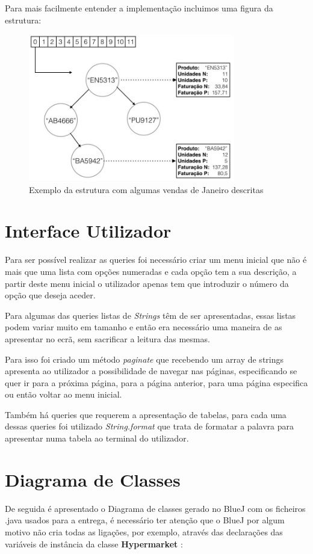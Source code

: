 \documentclass[10pt] {article}
\begin{document}
Para mais facilmente entender a implementação incluimos uma figura da estrutura:

\begin{figure}[ht!]
\centering
\includegraphics[width=90mm]{accounting.jpg}
\caption{Exemplo da estrutura com algumas vendas de Janeiro descritas}
\label{fig:sales}
\end{figure}

\newpage
\section{Interface Utilizador}

Para ser possível realizar as queries foi necessário criar um menu inicial que não é mais que uma lista com opções numeradas e cada opção tem a sua descrição, a partir deste menu inicial o utilizador apenas tem que introduzir o número da opção que deseja aceder.

Para algumas das queries listas de \emph{Strings} têm de ser apresentadas, essas listas podem variar muito  em tamanho e então era necessário uma maneira de as apresentar no ecrã, sem sacrificar a leitura das mesmas.

Para isso foi criado um método \emph{paginate} que recebendo um array de strings apresenta ao utilizador a possibilidade de navegar nas páginas, especificando se quer ir para a próxima página, para a página anterior, para uma página especifica ou então voltar ao menu inicial.

Também há queries que requerem a apresentação de tabelas, para cada uma dessas queries foi utilizado \emph{String.format} que trata de formatar a palavra para apresentar numa tabela ao terminal do utilizador.
\newpage
\section{Diagrama de Classes}
\par De seguida é apresentado o Diagrama de classes gerado no BlueJ com os ficheiros .java usados para a entrega, é
necessário ter atenção que o BlueJ por algum motivo não cria todas as ligações, por exemplo, através das declarações das
variáveis de instância da classe \color{blue} \textbf{Hypermarket} \color{black}:
\end{document}
